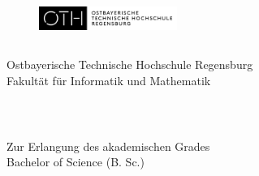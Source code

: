 \thispagestyle{empty}

\begin{figure}[t]
 \centering
 \includegraphics[width=0.4\textwidth]{assets/oth/logo}
\end{figure}

\begin{verbatim}
\end{verbatim}

\begin{center}
    \Large{Ostbayerische Technische Hochschule Regensburg} \\
    \Large{Fakultät für Informatik und Mathematik}
\end{center}

\begin{verbatim}
\end{verbatim}

\begin{center}
    \doublespacing
    \textbf{\huge{\titleDocument}}\\

    \onehalfspacing

    \begin{center}
        Zur Erlangung des akademischen Grades \\ Bachelor of Science (B. Sc.)
    \end{center}

    \begin{verbatim}
    \end{verbatim}

    \begin{doublespace}
        \textbf{\Large{{~\subjectDocument}}}
    \end{doublespace}
\end{center}

\begin{verbatim}
\end{verbatim}

\begin{verbatim}
\end{verbatim}

